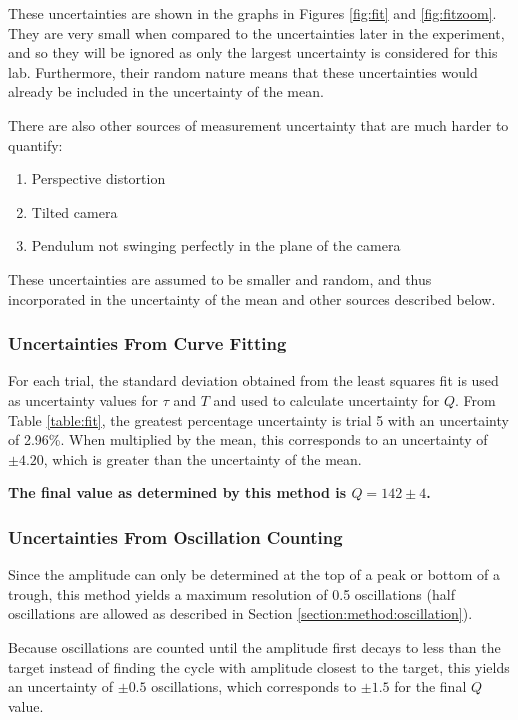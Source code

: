 \documentclass[aps,twocolumn,secnumarabic,nobalancelastpage,amsmath,amssymb,nofootinbib]{revtex4}
\begin{document}
These uncertainties are shown in the graphs in Figures \ref{fig:fit} and \ref{fig:fitzoom}. They are very small when
compared to the uncertainties later in the experiment, and so they will be ignored as only the largest uncertainty is
considered for this lab. Furthermore, their random nature means that these uncertainties would already be included in
the uncertainty of the mean.

There are also other sources of measurement uncertainty that are much harder to quantify:
\begin{enumerate}
    \item Perspective distortion
    \item Tilted camera
    \item Pendulum not swinging perfectly in the plane of the camera
\end{enumerate}
These uncertainties are assumed to be smaller and random, and thus incorporated in the uncertainty of the mean and other
sources described below.

\subsubsection{Uncertainties From Curve Fitting}

For each trial, the standard deviation obtained from the least squares fit is used as uncertainty values for \(\tau\)
and \(T\) and used to calculate uncertainty for \(Q\). From Table \ref{table:fit}, the greatest percentage uncertainty
is trial 5 with an uncertainty of 2.96\%. When multiplied by the mean, this corresponds to an uncertainty of
\(\pm 4.20\), which is greater than the uncertainty of the mean.

\textbf{The final value as determined by this method is \(Q = 142 \pm 4\).}

\subsubsection{Uncertainties From Oscillation Counting}

Since the amplitude can only be determined at the top of a peak or bottom of a trough, this method yields a maximum
resolution of 0.5 oscillations (half oscillations are allowed as described in Section \ref{section:method:oscillation}).

Because oscillations are counted until the amplitude first decays to less than the target instead of finding the cycle
with amplitude closest to the target, this yields an uncertainty of \(\pm 0.5\) oscillations, which corresponds to
\(\pm 1.5\) for the final \(Q\) value.
\end{document}
